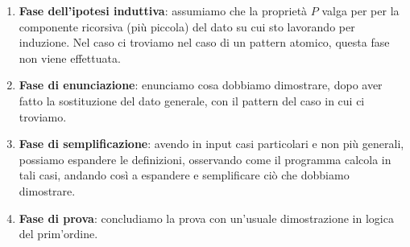 \documentclass[
  a4paper,
]{article}
\providecommand{\tightlist}{%
  \setlength{\itemsep}{0pt}\setlength{\parskip}{0pt}}
\begin{document}
\begin{enumerate}
\def\labelenumi{\arabic{enumi}.}
\setcounter{enumi}{1}
\tightlist
\item
  \textbf{Fase dell'ipotesi induttiva}: assumiamo che la proprietà \(P\)
  valga per per la componente ricorsiva (più piccola) del dato su cui
  sto lavorando per induzione. Nel caso ci troviamo nel caso di un
  pattern atomico, questa fase non viene effettuata.
\item
  \textbf{Fase di enunciazione}: enunciamo cosa dobbiamo dimostrare,
  dopo aver fatto la sostituzione del dato generale, con il pattern del
  caso in cui ci troviamo.
\item
  \textbf{Fase di semplificazione}: avendo in input casi particolari e
  non più generali, possiamo espandere le definizioni, osservando come
  il programma calcola in tali casi, andando così a espandere e
  semplificare ciò che dobbiamo dimostrare.
\item
  \textbf{Fase di prova}: concludiamo la prova con un'usuale
  dimostrazione in logica del prim'ordine. \[
  \]
\end{enumerate}
\end{document}
